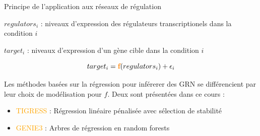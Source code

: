	
\begin{frame}{Principe de l'application aux réseaux de régulation}
    	
    	\begin{center}
    	\scriptsize 
    	$regulators_{i}$ : niveaux d'expression des régulateurs transcriptionels dans la condition $i$
    	
    	$target_{i}$  : niveaux d'expression d'un gène cible dans la condition $i$
    	\end{center}
    	\vspace{-0.15cm}
    	
    	\begin{block}{}
    	\begin{equation*}
    	    target_{i} = \textcolor{orange}{\textbf{f}}(regulators_{i}) + \epsilon_i
    	\end{equation*}
    	\end{block}
    	\vspace{0.25cm}

    	\scriptsize 
    	Les méthodes basées sur la régression pour inférerer des GRN se différencient par leur choix de modélisation pour $f$.
    	Deux sont présentées dans ce cours : 
    	\vspace{0.25cm}
    	
    	\begin{itemize}
    	    \item \textcolor{orange}{TIGRESS} : Régression linéaire pénalisée avec sélection de stabilité \cite{haury2012tigress}
    	    \item \textcolor{orange}{GENIE3} : Arbres de régression en random forests \cite{genie3}
    	\end{itemize}
\end{frame}
	



